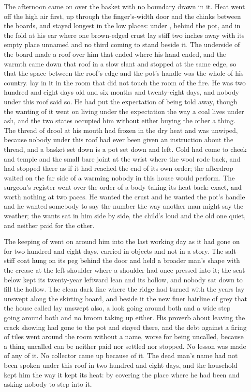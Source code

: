 The afternoon came on over the basket with no boundary drawn in it. Heat went off the high air first, up through the finger's-width door and the chinks between the boards, and stayed longest in the low places: under , behind the pot, and in the fold at his ear where one brown-edged crust lay stiff two inches away with its empty place unnamed and no third coming to stand beside it. The underside of the board made a roof over him that ended where his hand ended, and the warmth came down that roof in a slow slant and stopped at the same edge, so that the space between the roof's edge and the pot's handle was the whole of his country.  lay in it in the room that did not touch the room of the fire. He was two hundred and eight days old and six months and twenty-eight days, and nobody under this roof said so. He had put the expectation of being told away, though the wanting of it went on living under the expectation the way a coal lives under ash, and the two states occupied him without either buying the other a thing. The thread of drool at his mouth had frozen in the dry heat and was unwiped, because nobody under this roof had ever been given an instruction about the thread, and a basket set down is a pot set down and left. Cold had come to cheek and temple and the small bare joint at the wrist where the wool rode back, and had stopped there as if it had reached the end of its own order; the afterdrop waited on the far side of a warming nobody in this house would perform. The surgeon's register went over the order of a body taking its heat back: exact, and worth nothing at two paces. He wanted the crust and he wanted the pot's handle and he wanted somebody to say the number the way another man might say the weather; the wants sat in him side by side, the child's loud and the old one quiet, and neither paid for the other.

The keeping of  went on around him into the last working day as it had gone on for two hundred and eight days, carried in objects and not in a story. The salt-stiff coat hung on its peg behind the door and held a broader man's shape with the crease at the left shoulder where a shoulder had once pressed into it; the seat below kept its twenty-year leftward lean and its hollow, and nobody sat down to fill the hollow. The clean dark line where the ridge had turned with the years lay unswept along the skirting board, and beside it the new finer hairline of grey that the house called  lay unswept also, a look going around both and a wide step going around both and no broom taking up either. His proverb about leaving the crack showing had gone to the pot and stayed there, and the debt against a firing of tiles went around the room without a name, worse for being uncalled, because a thing uncalled can be neither paid nor settled nor stopped. No lesson was made of any of it. No collector came up  because of it. The dead man's name had not been spoken under this roof in two hundred and eight days, and the household kept him the way it kept its heat: by covering the place where he had been and asking nobody to step into it.

